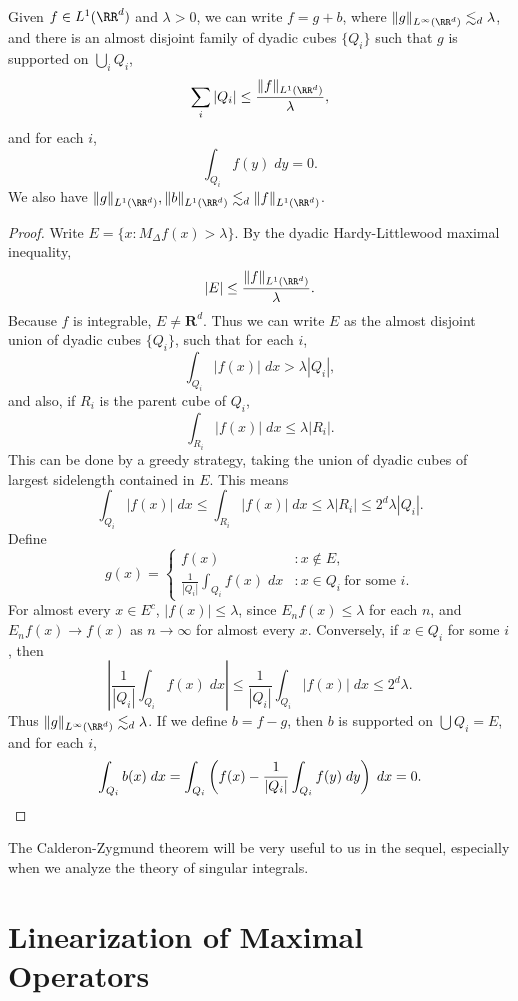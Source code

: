 \begin{theorem}
  Given $f \in L^1(\RR^d)$ and $\lambda > 0$, we can write $f = g + b$, where $\| g \|_{L^\infty(\RR^d)} \lesssim_d \lambda$, and there is an almost disjoint family of dyadic cubes $\{ Q_i \}$ such that $g$ is supported on $\bigcup_i Q_i$,
  \[ \sum_i |Q_i| \leq \frac{\| f \|_{L^1(\RR^d)}}{\lambda}, \]
  and for each $i$,
  \[ \int_{Q_i} f(y)\; dy = 0. \]
  We also have $\| g \|_{L^1(\RR^d)}, \| b \|_{L^1(\RR^d)} \lesssim_d \| f \|_{L^1(\RR^d)}$.
\end{theorem}
\begin{proof}
  Write $E = \{ x: M_\Delta f(x) > \lambda \}$. By the dyadic Hardy-Littlewood maximal inequality,
  \[ |E| \leq \frac{\| f \|_{L^1(\RR^d)}}{\lambda}. \]
  Because $f$ is integrable, $E \neq \mathbf{R}^d$. Thus we can write $E$ as the almost disjoint union of dyadic cubes $\{ Q_i \}$, such that for each $i$,
  \[ \int_{Q_i} |f(x)|\; dx > \lambda |Q_i|, \]
  and also, if $R_i$ is the parent cube of $Q_i$,
  \[ \int_{R_i} |f(x)|\; dx \leq \lambda |R_i|. \]
  This can be done by a greedy strategy, taking the union of dyadic cubes of largest sidelength contained in $E$. This means
  \[ \int_{Q_i} |f(x)|\; dx \leq \int_{R_i} |f(x)|\; dx \leq \lambda |R_i| \leq 2^d \lambda |Q_i|. \]
  Define
  \[ g(x) = \begin{cases} f(x) &: x \not \in E, \\ \frac{1}{|Q_i|} \int_{Q_i} f(x)\; dx &: x \in Q_i\ \text{for some $i$}. \end{cases} \]
  For almost every $x \in E^c$, $|f(x)| \leq \lambda$, since $E_n f(x) \leq \lambda$ for each $n$, and $E_n f(x) \to f(x)$ as $n \to \infty$ for almost every $x$. Conversely, if $x \in Q_i$ for some $i$, then
  \[ \left| \frac{1}{|Q_i|} \int_{Q_i} f(x)\; dx \right| \leq \frac{1}{|Q_i|} \int_{Q_i} |f(x)|\; dx \leq 2^d \lambda. \]
  Thus $\| g \|_{L^\infty(\RR^d)} \lesssim_d \lambda$. If we define $b = f - g$, then $b$ is supported on $\bigcup Q_i = E$, and for each $i$,
  \[ \int_{Q_i} b(x)\; dx = \int_{Q_i} \left( f(x) - \frac{1}{|Q_i|} \int_{Q_i} f(y)\; dy \right)\; dx = 0. \qedhere \]
\end{proof}

The Calderon-Zygmund theorem will be very useful to us in the sequel, especially when we analyze the theory of singular integrals.

\section{Linearization of Maximal Operators}

